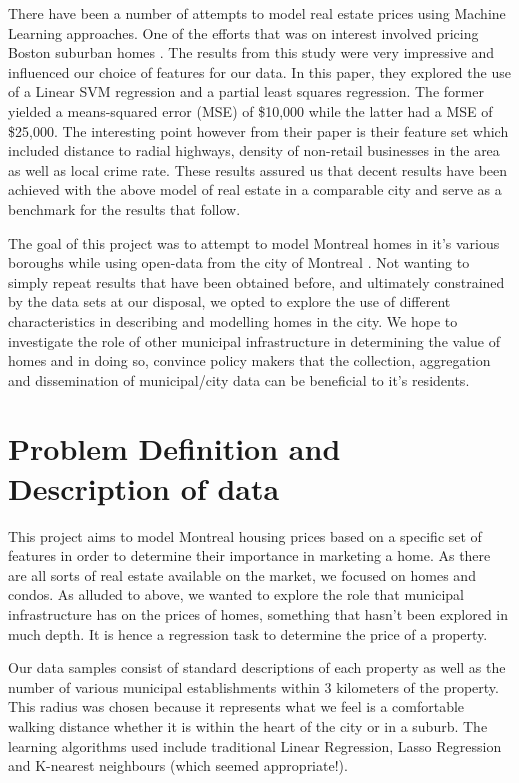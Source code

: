 \documentclass{acm_proc_article-sp}
\begin{document}
	There have been a number of attempts to model real estate prices using Machine Learning approaches. One of the efforts that was on interest involved pricing Boston suburban homes \cite{bostonres}. The results from this study were very impressive and influenced our choice of features for our data. In this paper, they explored the use of a Linear SVM regression and a partial least squares regression. The former yielded a means-squared error (MSE) of \$10,000 while the latter had a MSE of \$25,000. The interesting point however from their paper is their feature set which included distance to radial highways, density of non-retail businesses in the area as well as local crime rate. These results assured us that decent results have been achieved with the above model of real estate in a comparable city and serve as a benchmark for the results that follow. 
	
	The goal of this project was to attempt to model Montreal homes in it's various boroughs while using open-data from the city of Montreal \cite{data}. Not wanting to simply repeat results that have been obtained before, and ultimately constrained by the data sets at our disposal, we opted to explore the use of different characteristics in describing and modelling homes in the city. We hope to investigate the role of other municipal infrastructure in determining the value of homes and in doing so, convince policy makers that the collection, aggregation and dissemination of municipal/city data can be beneficial to it's residents.

\section{Problem Definition and Description of data}
	
	This project aims to model Montreal housing prices based on a specific set of features in order to determine their importance in marketing a home. As there are all sorts of real estate available on the market, we focused on homes and condos. As alluded to above, we wanted to explore the role that municipal infrastructure has on the prices of homes, something that hasn't been explored in much depth. It is hence a regression task to determine the price of a property.
	
	Our data samples consist of standard descriptions of each property as well as the number of various municipal establishments within 3 kilometers of the property. This radius was chosen because it represents what we feel is a comfortable walking distance whether it is within the heart of the city or in a suburb. The learning algorithms used include traditional Linear Regression, Lasso Regression and K-nearest neighbours (which seemed appropriate!). 
\end{document}
